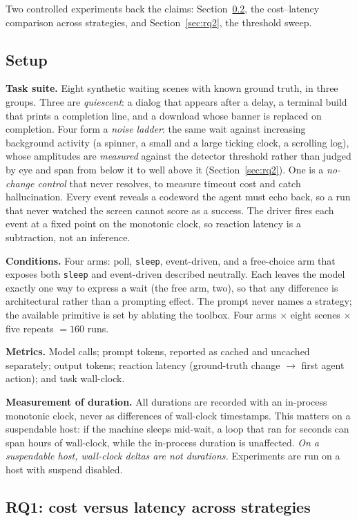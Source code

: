 \documentclass[conference]{IEEEtran}
\begin{document}
Two controlled experiments back the claims: Section~\ref{sec:rq1}, the cost--latency
comparison across strategies, and Section~\ref{sec:rq2}, the threshold sweep.

\subsection{Setup}
\label{sec:setup}
\textbf{Task suite.} Eight synthetic waiting scenes with known ground truth, in
three groups. Three are \emph{quiescent}: a dialog that appears after a delay, a
terminal build that prints a completion line, and a download whose banner is
replaced on completion. Four form a \emph{noise ladder}: the same wait against
increasing background activity (a spinner, a small and a large ticking clock, a
scrolling log), whose amplitudes are \emph{measured} against the detector
threshold rather than judged by eye and span from below it to well above it
(Section~\ref{sec:rq2}). One is a \emph{no-change control} that never resolves, to
measure timeout cost and catch hallucination. Every event reveals a codeword the
agent must echo back, so a run that never watched the screen cannot score as a
success. The driver fires each event at a fixed point on the monotonic clock, so
reaction latency is a subtraction, not an inference.

\textbf{Conditions.} Four arms: poll, \texttt{sleep}, event-driven, and a
free-choice arm that exposes both \texttt{sleep} and event-driven described
neutrally. Each leaves the model exactly one way to express a wait (the free arm,
two), so that any difference is architectural rather than a prompting effect. The
prompt never names a strategy; the available primitive is set by ablating the
toolbox. Four arms $\times$ eight scenes $\times$ five repeats $=160$ runs.

\textbf{Metrics.} Model calls; prompt tokens, reported as cached and uncached
separately; output tokens; reaction latency (ground-truth change $\rightarrow$
first agent action); and task wall-clock.

\textbf{Measurement of duration.} All durations are recorded with an in-process
monotonic clock, never as differences of wall-clock timestamps. This matters on a
suspendable host: if the machine sleeps mid-wait, a loop that ran for seconds can
span hours of wall-clock, while the in-process duration is unaffected. \emph{On a
suspendable host, wall-clock deltas are not durations.} Experiments are run on a
host with suspend disabled.

\subsection{RQ1: cost versus latency across strategies}
\label{sec:rq1}
\end{document}
